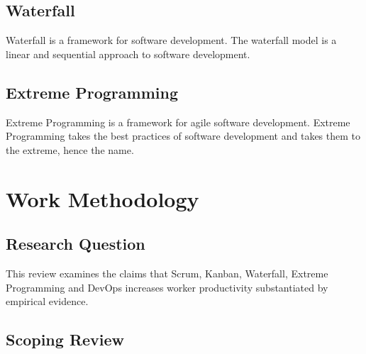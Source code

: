 \documentclass[12pt]{article}
\begin{document}
\subsection{Waterfall}
Waterfall \cite{WaterfallModel2025} is a framework for software development.
The waterfall model is a linear and sequential approach to software development.

\subsection{Extreme Programming}
Extreme Programming \cite{ExtremeProgramming2025} is a framework for agile software development.
Extreme Programming takes the best practices of software development and takes them to the extreme, hence the name.

\section{Work Methodology}

\subsection{Research Question}
This review examines the claims that Scrum, Kanban, Waterfall, Extreme Programming and DevOps 
increases worker productivity substantiated by empirical evidence.

\subsection{Scoping Review}
\end{document}
